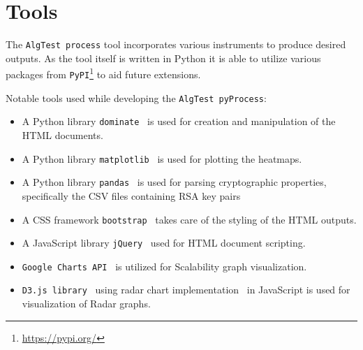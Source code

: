 \section{Tools}\label{sec:tools}
The \texttt{AlgTest process} tool incorporates various instruments to produce desired outputs. As the tool itself is written in Python it is able to utilize various packages from \texttt{PyPI}\footnote{\url{https://pypi.org/}} to aid future extensions.

Notable tools used while developing the \texttt{AlgTest pyProcess}:
\begin{itemize}
    \item A Python library \texttt{dominate}~\cite{dominateLib} is used for creation and manipulation of the HTML documents.
    \item A Python library \texttt{matplotlib}~\cite{matplotlibLib} is used for plotting the heatmaps.
    \item A Python library \texttt{pandas}~\cite{pandasLib} is used for parsing cryptographic properties, specifically the CSV files containing RSA key pairs
    \item A CSS framework \texttt{bootstrap}~\cite{bootstrapFw} takes care of the styling of the HTML outputs.
    \item A JavaScript library \texttt{jQuery}~\cite{jQueryLib} used for HTML document scripting.
    \item \texttt{Google Charts API}~\cite{gchartsAPI} is utilized for Scalability graph visualization.
    \item \texttt{D3.js library}~\cite{d3jsLib} using radar chart implementation~\cite{d3radarChartImple} in JavaScript is used for visualization of Radar graphs.
\end{itemize}

